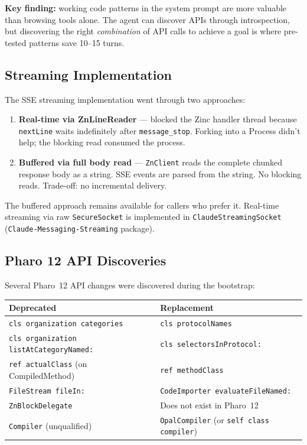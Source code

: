 \documentclass[a4paper,10pt,fleqn]{article}
\newcommand{\cls}[1]{\texttt{#1}}
\newcommand{\pkg}[1]{\texttt{#1}}
\begin{document}
\textbf{Key finding:} working code patterns in the system prompt are
more valuable than browsing tools alone.  The agent can discover APIs
through introspection, but discovering the right \emph{combination} of
API calls to achieve a goal is where pre-tested patterns save 10--15
turns.

\subsection{Streaming Implementation}

The SSE streaming implementation went through two approaches:

\begin{enumerate}
  \item \textbf{Real-time via ZnLineReader} --- blocked the Zinc handler
    thread because \texttt{nextLine} waits indefinitely after
    \texttt{message\_stop}.  Forking into a Process didn't help; the
    blocking read consumed the process.
  \item \textbf{Buffered via full body read} --- \texttt{ZnClient} reads
    the complete chunked response body as a string.  SSE events are
    parsed from the string.  No blocking reads.  Trade-off: no
    incremental delivery.
\end{enumerate}

The buffered approach remains available for callers who prefer it.
Real-time streaming via raw \texttt{SecureSocket} is implemented in
\cls{ClaudeStreamingSocket} (\pkg{Claude-Messaging-Streaming} package).

\subsection{Pharo 12 API Discoveries}

Several Pharo~12 API changes were discovered during the bootstrap:

\begin{center}
\begin{tabularx}{\linewidth}{@{}lY@{}}
\toprule
\textbf{Deprecated} & \textbf{Replacement} \\
\midrule
\texttt{cls organization categories} & \texttt{cls protocolNames} \\
\texttt{cls organization listAtCategoryNamed:} &
  \texttt{cls selectorsInProtocol:} \\
\texttt{ref actualClass} (on CompiledMethod) &
  \texttt{ref methodClass} \\
\texttt{FileStream fileIn:} & \texttt{CodeImporter evaluateFileNamed:} \\
\texttt{ZnBlockDelegate} & Does not exist in Pharo~12 \\
\texttt{Compiler} (unqualified) & \texttt{OpalCompiler} (or
  \texttt{self class compiler}) \\
\bottomrule
\end{tabularx}
\end{center}
\end{document}
